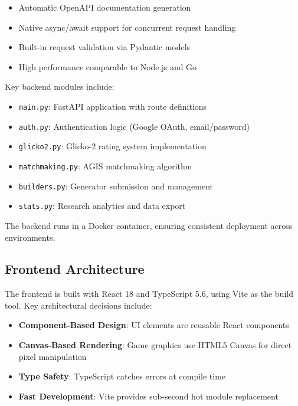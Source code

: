 \documentclass[11pt,a4paper]{article}
\theoremstyle{plain}
\theoremstyle{definition}
\theoremstyle{remark}
\begin{document}
\begin{itemize}
    \item Automatic OpenAPI documentation generation
    \item Native async/await support for concurrent request handling
    \item Built-in request validation via Pydantic models
    \item High performance comparable to Node.js and Go
\end{itemize}

Key backend modules include:

\begin{itemize}
    \item \texttt{main.py}: FastAPI application with route definitions
    \item \texttt{auth.py}: Authentication logic (Google OAuth, email/password)
    \item \texttt{glicko2.py}: Glicko-2 rating system implementation
    \item \texttt{matchmaking.py}: AGIS matchmaking algorithm
    \item \texttt{builders.py}: Generator submission and management
    \item \texttt{stats.py}: Research analytics and data export
\end{itemize}

The backend runs in a Docker container, ensuring consistent deployment across environments.

\subsection{Frontend Architecture}
\label{subsec:frontend}

The frontend is built with React 18 and TypeScript 5.6, using Vite as the build tool. Key architectural decisions include:

\begin{itemize}
    \item \textbf{Component-Based Design}: UI elements are reusable React components
    \item \textbf{Canvas-Based Rendering}: Game graphics use HTML5 Canvas for direct pixel manipulation
    \item \textbf{Type Safety}: TypeScript catches errors at compile time
    \item \textbf{Fast Development}: Vite provides sub-second hot module replacement
\end{itemize}
\end{document}
